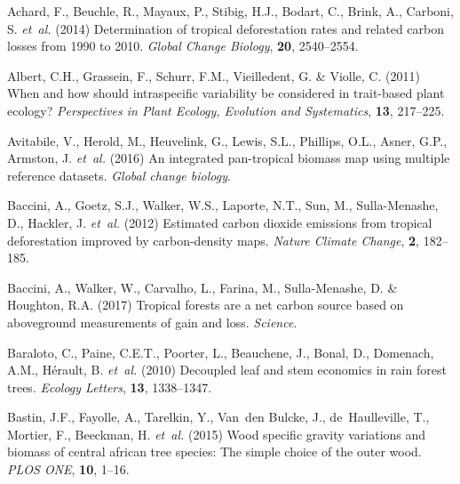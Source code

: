 \documentclass[a4paper, 12pt, leqno, dvipsnames]{article}\usepackage[]{graphicx}\usepackage[]{color}
\begin{document}
\begin{thebibliography}{50}
\providecommand{\natexlab}[1]{#1}

Achard, F., Beuchle, R., Mayaux, P., Stibig, H.J., Bodart, C., Brink, A.,
  Carboni, S. \emph{et~al.} (2014) Determination of tropical deforestation
  rates and related carbon losses from 1990 to 2010.
\newblock \emph{Global Change Biology}, \textbf{20}, 2540--2554.

Albert, C.H., Grassein, F., Schurr, F.M., Vieilledent, G. \& Violle, C. (2011)
  When and how should intraspecific variability be considered in trait-based
  plant ecology?
\newblock \emph{Perspectives in Plant Ecology, Evolution and Systematics},
  \textbf{13}, 217--225.

Avitabile, V., Herold, M., Heuvelink, G., Lewis, S.L., Phillips, O.L., Asner,
  G.P., Armston, J. \emph{et~al.} (2016) An
  integrated pan-tropical biomass map using multiple reference datasets.
\newblock \emph{Global change biology}.

Baccini, A., Goetz, S.J., Walker, W.S., Laporte, N.T., Sun, M., Sulla-Menashe,
  D., Hackler, J. \emph{et~al.} (2012) Estimated carbon dioxide emissions from tropical
  deforestation improved by carbon-density maps.
\newblock \emph{Nature Climate Change}, \textbf{2}, 182--185.

Baccini, A., Walker, W., Carvalho, L., Farina, M., Sulla-Menashe, D. \&
  Houghton, R.A. (2017) Tropical forests are a net carbon source based on
  aboveground measurements of gain and loss.
\newblock \emph{Science}.

Baraloto, C., Paine, C.E.T., Poorter, L., Beauchene, J., Bonal, D.,
  Domenach, A.M., Hérault, B. \emph{et~al.} (2010)
  Decoupled leaf and stem economics in rain forest trees.
\newblock \emph{Ecology Letters}, \textbf{13}, 1338--1347.

Bastin, J.F., Fayolle, A., Tarelkin, Y., Van~den Bulcke, J., de~Haulleville,
  T., Mortier, F., Beeckman, H. \emph{et~al.} (2015) Wood specific gravity variations and biomass of
  central african tree species: The simple choice of the outer wood.
\newblock \emph{PLOS ONE}, \textbf{10}, 1--16.


\end{thebibliography}
\end{document}

